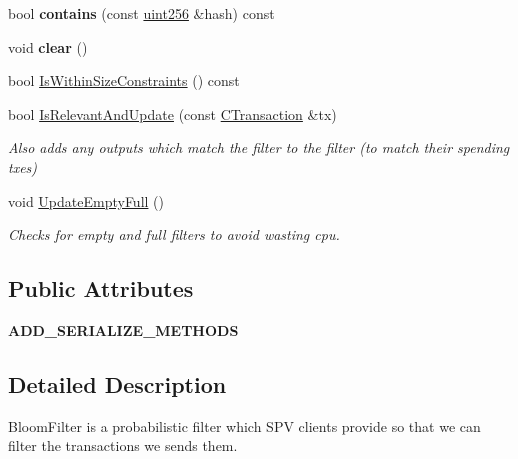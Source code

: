 \begin{DoxyCompactItemize}
\item 
\mbox{\label{class_c_bloom_filter_a4c26810781cdc0fd34443f32612ac83b}} 
bool {\bfseries contains} (const \mbox{\hyperlink{classuint256}{uint256}} \&hash) const
\item 
\mbox{\label{class_c_bloom_filter_abf30228c0b24c57530f6b6734cd40252}} 
void {\bfseries clear} ()
\item 
bool \mbox{\hyperlink{class_c_bloom_filter_a06f2094da8e7d9c6ad4ea426858e32de}{Is\+Within\+Size\+Constraints}} () const
\item 
\mbox{\label{class_c_bloom_filter_aec420a9b66ab133090c2b4b8ed286f79}} 
bool \mbox{\hyperlink{class_c_bloom_filter_aec420a9b66ab133090c2b4b8ed286f79}{Is\+Relevant\+And\+Update}} (const \mbox{\hyperlink{class_c_transaction}{C\+Transaction}} \&tx)
\begin{DoxyCompactList}\small\item\em Also adds any outputs which match the filter to the filter (to match their spending txes) \end{DoxyCompactList}\item 
\mbox{\label{class_c_bloom_filter_af98b43e91c82a1e4afc7454e8c5672c2}} 
void \mbox{\hyperlink{class_c_bloom_filter_af98b43e91c82a1e4afc7454e8c5672c2}{Update\+Empty\+Full}} ()
\begin{DoxyCompactList}\small\item\em Checks for empty and full filters to avoid wasting cpu. \end{DoxyCompactList}\end{DoxyCompactItemize}
\subsection*{Public Attributes}
\begin{DoxyCompactItemize}
\item 
\mbox{\label{class_c_bloom_filter_aac1b6a065059e07177ec836929190ad0}} 
{\bfseries A\+D\+D\+\_\+\+S\+E\+R\+I\+A\+L\+I\+Z\+E\+\_\+\+M\+E\+T\+H\+O\+DS}
\end{DoxyCompactItemize}


\subsection{Detailed Description}
Bloom\+Filter is a probabilistic filter which S\+PV clients provide so that we can filter the transactions we sends them.

